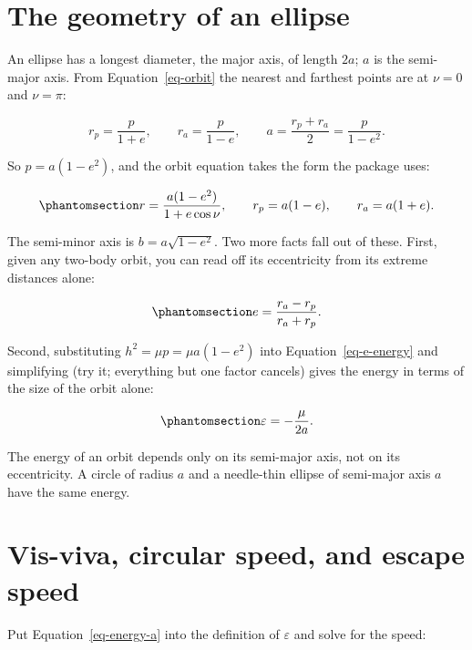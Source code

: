 \documentclass[
  10.5pt,
  letterpaper,
]{scrbook}
\theoremstyle{definition}
\theoremstyle{plain}
\theoremstyle{remark}
\begin{document}
\section{The geometry of an ellipse}\label{the-geometry-of-an-ellipse}

An ellipse has a longest diameter, the major axis, of length \(2a\);
\(a\) is the semi-major axis. From Equation~\ref{eq-orbit} the nearest
and farthest points are at \(\nu = 0\) and \(\nu = \pi\):

\[
r_p = \frac{p}{1+e}, \qquad r_a = \frac{p}{1-e}, \qquad a = \frac{r_p + r_a}{2} = \frac{p}{1-e^2}.
\]

So \(p = a(1-e^2)\), and the orbit equation takes the form the package
uses:

\begin{equation}\protect\phantomsection\label{eq-orbit-a}{
r = \frac{a(1-e^2)}{1+e\cos\nu}, \qquad r_p = a(1-e), \qquad r_a = a(1+e).
}\end{equation}

The semi-minor axis is \(b = a\sqrt{1-e^2}\). Two more facts fall out of
these. First, given any two-body orbit, you can read off its
eccentricity from its extreme distances alone:

\begin{equation}\protect\phantomsection\label{eq-e-from-extremes}{
e = \frac{r_a - r_p}{r_a + r_p}.
}\end{equation}

Second, substituting \(h^2 = \mu p = \mu a(1-e^2)\) into
Equation~\ref{eq-e-energy} and simplifying (try it; everything but one
factor cancels) gives the energy in terms of the size of the orbit
alone:

\begin{equation}\protect\phantomsection\label{eq-energy-a}{
\varepsilon = -\frac{\mu}{2a}.
}\end{equation}

The energy of an orbit depends only on its semi-major axis, not on its
eccentricity. A circle of radius \(a\) and a needle-thin ellipse of
semi-major axis \(a\) have the same energy.

\section{Vis-viva, circular speed, and escape
speed}\label{vis-viva-circular-speed-and-escape-speed}

Put Equation~\ref{eq-energy-a} into the definition of \(\varepsilon\)
and solve for the speed:
\end{document}
